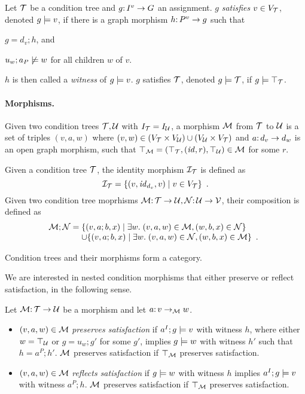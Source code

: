 \begin{definition}[satisfaction]\label{def:satisfaction}
Let ${\mathcal{T}}$ be a condition tree and $g{:}\, I^v\rightarrow G$ an assignment. $g$ \emph{satisfies $v\in V_{\mathcal{T}}$}, denoted $g\models v$, if there is a graph morphism $h{:}\, P^v\rightarrow g$ such that
\begin{inumerate}
\item $g=d_v;h$, and 
\item $u_w;a_P\not\models w$ for all children $w$ of $v$.
\end{inumerate}
$h$ is then called a \emph{witness} of $g\models v$.
$g$ satisfies ${\mathcal{T}}$, denoted $g\models{\mathcal{T}}$, if $g\models\top_{{\mathcal{T}}}$.
\end{definition}

\paragraph{Morphisms.}

Given two condition trees ${\mathcal{T}},{\mathcal{U}}$ with $I_{\mathcal{T}}=I_{\mathcal{U}}$, a morphism ${\mathcal{M}}$ from ${\mathcal{T}}$ to ${\mathcal{U}}$ is a set of triples $(v,a,w)$ where $(v,w)\in (V_{\mathcal{T}}\times V_{\mathcal{U}})\cup (V_{\mathcal{U}}\times V_{\mathcal{T}})$ and $a{:}\, d_v\rightarrow d_w$ is an open graph morphism, such that $\top_{{\mathcal{M}}}=(\top_{{\mathcal{T}}},({\mathit{id}},r),\top_{{\mathcal{U}}})\in {\mathcal{M}}$ for some $r$.

Given a condition tree ${\mathcal{T}}$, the identity morphism ${\mathcal{I}}_{\mathcal{T}}$ is defined as
\[ {\mathcal{I}}_{\mathcal{T}} = \{{(v,{\mathit{id}}_{d_v},v)\mid v\in V_{\mathcal{T}}}\} \enspace. \]
Given two condition tree moprhisms ${\mathcal{M}}{:}\, {\mathcal{T}}\rightarrow {\mathcal{U}},{\mathcal{N}}{:}\, {\mathcal{U}}\rightarrow {\mathcal{V}}$, their composition is defined as
\[ \cM;\cN =
\begin{array}[t]{@{}l}
	\setof{(v,a;b,x) \mid \exists w\st (v,a,w)\in \cM, (w,b,x)\in \cN} \\
	\cup \setof{(v,a;b,x) \mid \exists w\st (v,a,w)\in \cN, (w,b,x)\in \cM} \enspace.
\end{array}
\]

\begin{proposition}
Condition trees and their morphisms form a category.
\end{proposition}

We are interested in nested condition morphisms that either preserve or reflect satisfaction, in the following sense.

\begin{definition}
Let ${\mathcal{M}}{:}\, {\mathcal{T}}\rightarrow{\mathcal{U}}$ be a morphism and let $a{:}\, v\rightarrow_{\mathcal{M}} w$.
\begin{itemize}[topsep=\smallskipamount]
\item $(v,a,w)\in {\mathcal{M}}$ \emph{preserves satisfaction} if $a^I;g\models v$ with witness $h$, where either $w=\top_{{\mathcal{U}}}$ or $g=u_w;g'$ for some $g'$, implies $g\models w$ with witness $h'$ such that $h=a^P;h'$. ${\mathcal{M}}$ preserves satisfaction if $\top_{{\mathcal{M}}}$ preserves satisfaction.
\item $(v,a,w)\in {\mathcal{M}}$ \emph{reflects satisfaction} if $g\models w$ with witness $h$ implies $a^I;g\models v$ with witness $a^P;h$. ${\mathcal{M}}$ preserves satisfaction if $\top_{{\mathcal{M}}}$ preserves satisfaction.
\end{itemize}
\end{definition}


